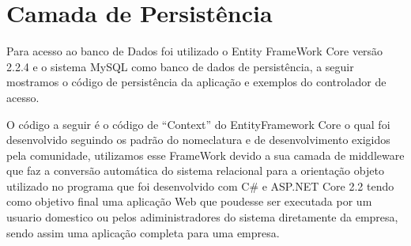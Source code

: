 \documentclass[a4paper,10pt]{article}
\begin{document}
\begin{lstlisting}

\end{lstlisting}


\section{Camada de Persistência}

Para acesso ao banco de Dados foi utilizado o Entity FrameWork Core versão 2.2.4 e o sistema MySQL como banco de dados de persistência, a seguir mostramos o código de persistência da aplicação e exemplos do controlador de acesso. 

O código a seguir é o código de ``Context'' do EntityFramework Core o qual foi desenvolvido seguindo os padrão do nomeclatura e de desenvolvimento exigidos pela comunidade, utilizamos esse FrameWork devido a sua camada de middleware que faz a conversão automática do sistema relacional para a orientação objeto utilizado no programa que foi desenvolvido com C\# e ASP.NET Core 2.2 tendo como objetivo final uma aplicação Web que poudesse ser executada por um usuario domestico ou pelos adiministradores do sistema diretamente da empresa, sendo assim uma aplicação completa para uma empresa. 

\lstset{style=cstyle} 
\end{document}

